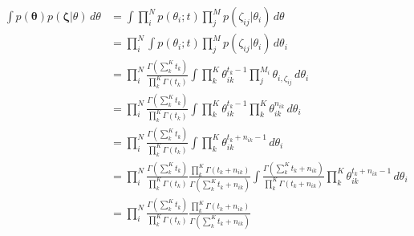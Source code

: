 \documentclass[12pt]{article}
\begin{document}
\begin{align*}
\int p(\bm{\theta})p(\bm{\zeta} | \theta) \,d\theta  & = \int \prod^N_{i}p(\theta_i; t)\prod^M_{j}p(\zeta_{ij} | \theta_i) \,d\theta \\
 & = \prod^N_{i} \int p(\theta_i; t)\prod^M_{j}p(\zeta_{ij} | \theta_i) \,d\theta_i \\
 & = \prod^N_{i} \frac{\Gamma(\sum^K_{k} t_k)}{\prod^K_{k} \Gamma(t_k)} \int \prod^K_{k} \theta_{ik}^{t_k - 1} \prod^{M_i}_{j} \theta_{i, \zeta_{ij}} \,d\theta_i \\
  & = \prod^N_{i} \frac{\Gamma(\sum^K_{k} t_k)}{\prod^K_{k} \Gamma(t_k)} \int \prod^K_{k} \theta_{ik}^{t_k - 1} \prod^K_{k} \theta_{ik}^{n_{ik}} \,d\theta_i \\
    & = \prod^N_{i} \frac{\Gamma(\sum^K_{k} t_k)}{\prod^K_{k} \Gamma(t_k)} \int \prod^K_{k} \theta_{ik}^{t_k + n_{ik} - 1} \,d\theta_i \\
        & = \prod^N_{i} \frac{\Gamma(\sum^K_{k} t_k)}{\prod^K_{k} \Gamma(t_k)} \frac{\prod^K_{k} \Gamma(t_k + n_{ik}) }{\Gamma(\sum^K_{k} t_k + n_{ik})} \int \frac{\Gamma(\sum^K_{k} t_k + n_{ik})}{\prod^K_{k} \Gamma(t_k + n_{ik})} \prod^K_{k} \theta_{ik}^{t_k + n_{ik} - 1} \,d\theta_i \\
        & = \prod^N_{i} \frac{\Gamma(\sum^K_{k} t_k)}{\prod^K_{k} \Gamma(t_k)} \frac{\prod^K_{k} \Gamma(t_k + n_{ik}) }{\Gamma(\sum^K_{k} t_k + n_{ik})} \\
\end{align*}
\end{document}
